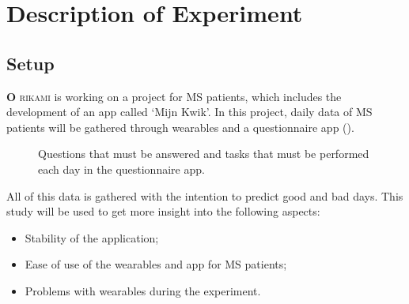 
\chapter{Description of Experiment}\label{chapter: Description of Experiment}
\section{Setup}
\lettrine[lhang = 0.4, findent=-60pt, lines=7]{\textbf{
		\initfamily \fontsize{40mm}{40mm} \selectfont O
		\normalfont}}{rikami}
is working on a project for MS patients, which includes the development of an app called `Mijn Kwik'.
In this project, daily data of MS patients will be gathered through wearables and a questionnaire app ().
%
\begin{figure}
	\centering
	\hspace{2cm}
	\vfill
	\hspace{2cm}	
	
	\caption{Questions that must be answered and tasks that must be performed  each day in the questionnaire app.}
	\label{fig:app}
\end{figure}
%
All of this data is gathered with the intention to predict good and bad days.
This study will be used to get more insight into the following aspects:
%
\begin{itemize}
	\item Stability of the application;
	\item Ease of use of the wearables and app for MS patients; 
	\item Problems with wearables during the experiment.
\end{itemize}
